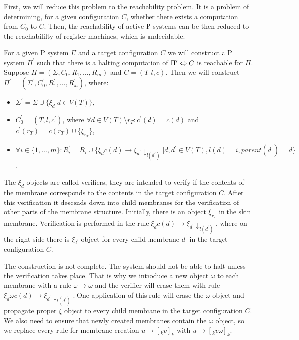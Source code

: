 \documentclass[llncs,submission,copyright,creativecommons]{../lib/lncs/llncs}
\begin{document}
First, we will reduce this problem to the reachability problem. It is a problem of determining, for a given configuration $C$, whether there exists a computation from $C_0$ to $C$. Then, the reachability of active P systems can be then reduced to the reachabililty of register machines, which is undecidable.

For a given P system $\Pi$ and a target configuration $C$ we will construct a P system $\Pi^\prime$ such that there is a halting computation of $\Pi^\prime\Leftrightarrow\linebreak C$ is reachable for $\Pi$. Suppose $\Pi = (\Sigma, C_0, R_1, \dots, R_m)$ and $C = (T, l, c)$. Then we will construct $\Pi^\prime = (\Sigma^\prime, C_0^\prime, R_1^\prime, \dots, R_m^\prime)$, where:

\begin{itemize}
  \item $\Sigma^\prime = \Sigma\cup\{\xi_d|d\in V(T)\}$,
  \item $C_0^\prime = (T, l, c^\prime)$, where $\forall d\in V(T)\setminus r_T: c^\prime(d) = c(d)$ and $c^\prime(r_T) = c(r_T)\cup\{\xi_{r_T}\}$,
  \item $\forall i\in\{1,\dots, m\}: R_i^\prime = R_i\cup\{\xi_d c(d)\rightarrow\xi_{d^\prime}\downarrow_{l(d^\prime)}|d,d^\prime\in V(T),l(d)=i,parent(d^\prime)=d\}$.
\end{itemize}

The $\xi_d$ objects are called verifiers, they are intended to verify if the contents of the membrane corresponds to the contents in the target configuration $C$. After this verification it descends down into child membranes for the verification of other parts of the membrane structure.
Initially, there is an object $\xi_{r_T}$ in the skin membrane. Verification is performed in the rule $\xi_d c(d)\rightarrow\xi_{d^\prime}\downarrow_{l(d^\prime)}$, where on the right side there is $\xi_{d^\prime}$ object for every child membrane $d^\prime$ in the target configuration $C$.

The construction is not complete. The system should not be able to halt unless the verification takes place. That is why we introduce a new object $\omega$ to each membrane with a rule $\omega\rightarrow\omega$ and the verifier will erase them with rule $\xi_d\omega c(d)\rightarrow\xi_{d^\prime}\downarrow_{l(d^\prime)}$. One application of this rule will erase the $\omega$ object and propagate proper $\xi$ object to every child membrane in the target configuration $C$. We also need to ensure that newly created membranes contain the $\omega$ object, so we replace every rule for membrane creation $u\rightarrow [_k v]_k$ with $u\rightarrow [_k v\omega]_k$.
\end{document}

